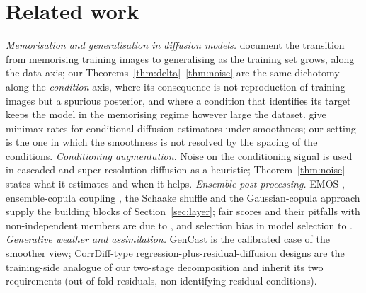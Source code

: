 \documentclass[11pt]{article}
\begin{document}
\section{Related work}
\emph{Memorisation and generalisation in diffusion models.} \citet{kadkhodaie2023,yoon2023,somepalli2023} document the transition from memorising training images to generalising as the training set grows, along the data axis; our Theorems~\ref{thm:delta}--\ref{thm:noise} are the same dichotomy along the \emph{condition} axis, where its consequence is not reproduction of training images but a spurious posterior, and where a condition that identifies its target keeps the model in the memorising regime however large the dataset. \citet{tang2024conditional} give minimax rates for conditional diffusion estimators under smoothness; our setting is the one in which the smoothness is not resolved by the spacing of the conditions. \emph{Conditioning augmentation.} Noise on the conditioning signal is used in cascaded and super-resolution diffusion \citep{ho2022cascaded} as a heuristic; Theorem~\ref{thm:noise} states what it estimates and when it helps. \emph{Ensemble post-processing.} EMOS \citep{gneiting2005emos}, ensemble-copula coupling \citep{schefzik2013ecc}, the Schaake shuffle and the Gaussian-copula approach \citep{moller2013gca} supply the building blocks of Section~\ref{sec:layer}; fair scores and their pitfalls with non-independent members are due to \citet{ferro2014,roberts2026}, and selection bias in model selection to \citet{cawley2010}. \emph{Generative weather and assimilation.} GenCast \citep{price2025gencast} is the calibrated case of the smoother view; CorrDiff-type regression-plus-residual-diffusion designs are the training-side analogue of our two-stage decomposition and inherit its two requirements (out-of-fold residuals, non-identifying residual conditions).
\end{document}

